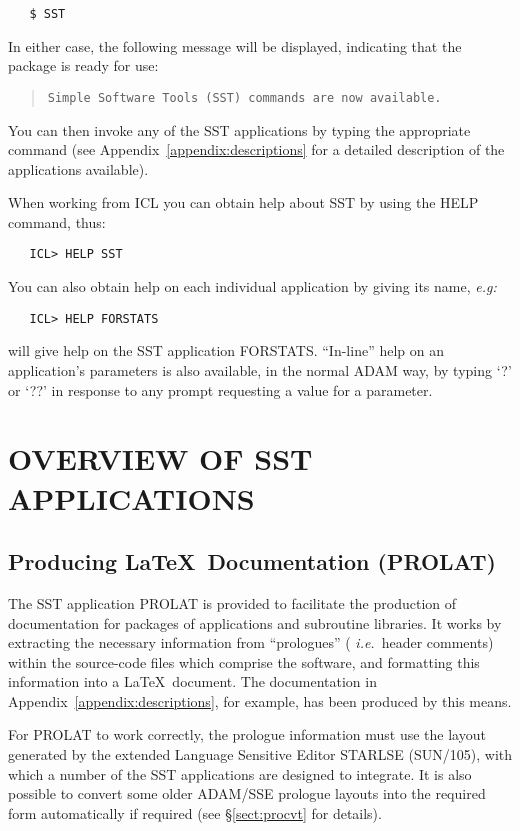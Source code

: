 \begin{verbatim}
   $ SST
\end{verbatim}

In either case, the following message will be displayed, indicating that the
package is ready for use:

\begin{quote}
{\tt Simple Software Tools (SST) commands are now available.}
\end{quote}

You can then invoke any of the SST applications by typing the appropriate
command (see Appendix~\ref{appendix:descriptions} for a detailed description
of the applications available).

When working from ICL you can obtain help about SST by using the HELP command,
thus:

\begin{verbatim}
   ICL> HELP SST
\end{verbatim}

You can also obtain help on each individual application by giving its name,
{\em e.g:}

\begin{verbatim}
   ICL> HELP FORSTATS
\end{verbatim}

will give help on the SST application FORSTATS.
``In-line'' help on an application's parameters is also available, in the
normal ADAM way, by typing `?' or `??' in response to any prompt requesting a
value for a parameter.


\section{OVERVIEW OF SST APPLICATIONS}

\subsection{Producing \LaTeX\ Documentation (PROLAT)}

The SST application PROLAT is provided to facilitate the production of
documentation for packages of applications and subroutine libraries.
It works by extracting the necessary information from ``prologues'' ({\em
i.e.}\ header comments) within the source-code files which comprise the
software, and formatting this information into a \LaTeX\ document.
The documentation in Appendix~\ref{appendix:descriptions}, for example, has
been produced by this means.

For PROLAT to work correctly, the prologue information must use the layout
generated by the extended Language Sensitive Editor STARLSE (SUN/105), with
which a number of the SST applications are designed to integrate.
It is also possible to convert some older ADAM/SSE prologue layouts into the
required form automatically if required (see \S\ref{sect:procvt} for
details).


